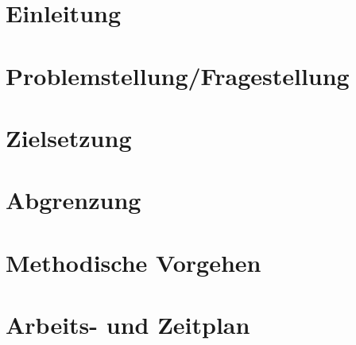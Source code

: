 \documentclass{article}
\begin{document}
\section{Einleitung}

\section{Problemstellung/Fragestellung}

\section{Zielsetzung}

\section{Abgrenzung}

\section{Methodische Vorgehen}

\section{Arbeits- und Zeitplan}
\end{document}
